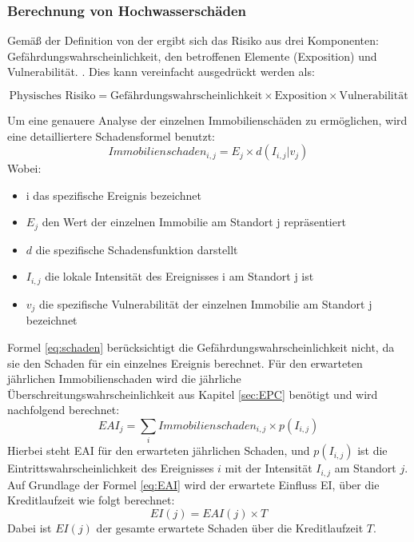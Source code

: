 \subsubsection{Berechnung von Hochwasserschäden}
Gemäß der Definition von der \textcite{undro1979} ergibt sich das Risiko aus drei Komponenten: Gefährdungswahrscheinlichkeit,  den betroffenen Elemente (Exposition) und Vulnerabilität. \parencite{coburn1991vulnerability}. Dies kann vereinfacht ausgedrückt werden als:

\begin{equation}
    \text{Physisches Risiko} = \text{Gefährdungswahrscheinlichkeit} \times \text{Exposition} \times \text{Vulnerabilität}
\end{equation}

Um eine genauere Analyse der einzelnen Immobilienschäden zu ermöglichen, wird eine detailliertere Schadensformel \parencite{vanweddingen2023physicalrisk} benutzt:
\begin{equation}
    Immobilienschaden_{i,j} = E_j \times d(I_{i,j}|v_j)
    \label{eq:schaden}
\end{equation}
Wobei:
\begin{itemize}
    \item i das spezifische Ereignis bezeichnet
    \item $E_j$ den Wert der einzelnen Immobilie am Standort j repräsentiert
    \item $d$ die spezifische Schadensfunktion darstellt
    \item $I_{i,j}$ die lokale Intensität des Ereignisses i am Standort j ist
    \item $v_j$ die spezifische Vulnerabilität der einzelnen Immobilie am Standort j bezeichnet
\end{itemize}

Formel \ref{eq:schaden} berücksichtigt die Gefährdungswahrscheinlichkeit nicht, da sie den Schaden für ein einzelnes Ereignis berechnet. Für den erwarteten jährlichen Immobilienschaden wird die jährliche Überschreitungswahrscheinlichkeit aus Kapitel \ref{sec:EPC} benötigt und wird nachfolgend berechnet:
\begin{equation}
    EAI_j = \sum_i Immobilienschaden_{i,j} \times p(I_{i,j})
    \label{eq:EAI}
\end{equation}
Hierbei steht \acs{EAI} für den erwarteten jährlichen Schaden, und \( p(I_{i,j}) \) ist die Eintrittswahrscheinlichkeit des Ereignisses \( i \) mit der Intensität \( I_{i,j} \) am Standort \( j \).
Auf Grundlage der Formel \ref{eq:EAI} wird der erwartete Einfluss \acs{EI}, über die Kreditlaufzeit wie folgt berechnet:
\begin{equation}
    EI(j) = EAI(j) \times T
\end{equation}
Dabei ist \( EI(j) \) der gesamte erwartete Schaden über die Kreditlaufzeit \( T \).

